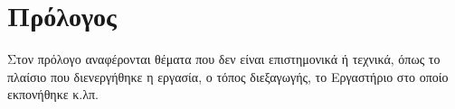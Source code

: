\documentclass[../main.tex]{subfiles}
\begin{document}
\section*{Πρόλογος}

Στον πρόλογο αναφέρονται θέματα που δεν είναι επιστημονικά ή τεχνικά, όπως το πλαίσιο που διενεργήθηκε η εργασία, ο τόπος διεξαγωγής, το Εργαστήριο στο οποίο εκπονήθηκε κ.λπ. 
\clearpage
\end{document}
